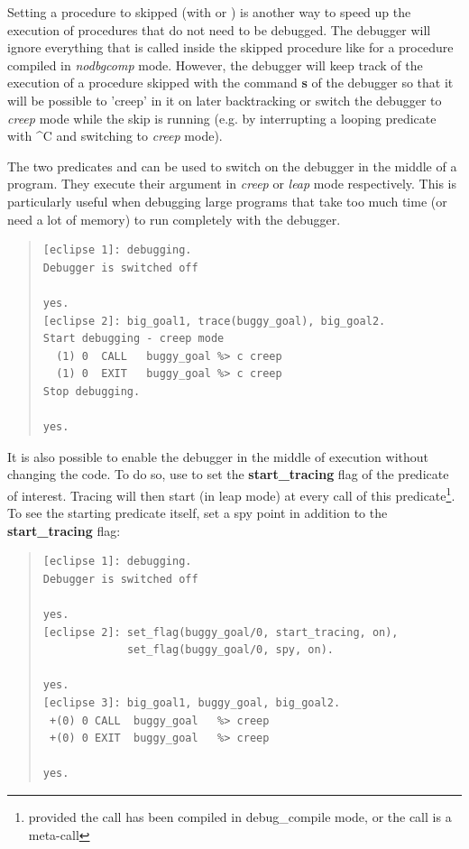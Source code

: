 Setting a procedure to skipped (with
 or
)
is another way
to speed up the execution of procedures that do not need to be
debugged.  The debugger will ignore everything that is called inside
the skipped procedure like for a procedure compiled in {\it nodbgcomp}
mode.  However, the debugger will keep track of the execution of a
procedure skipped with the command {\bf s} of the debugger so that it
will be possible to 'creep' in it on later backtracking or switch the
debugger to {\it creep} mode while the skip is running (e.g.  by
interrupting a looping predicate with \^\space C and switching to {\it
creep} mode).

The two predicates
 and
 can be used to
switch on the debugger in the middle of a program.  They execute their
argument in {\it creep} or {\it leap} mode respectively.  This is
particularly useful when debugging large programs that take too much
time (or need a lot of memory) to run completely with the debugger.
\begin{quote}\begin{verbatim}
[eclipse 1]: debugging.
Debugger is switched off

yes.
[eclipse 2]: big_goal1, trace(buggy_goal), big_goal2.
Start debugging - creep mode
  (1) 0  CALL   buggy_goal %> c creep
  (1) 0  EXIT   buggy_goal %> c creep
Stop debugging.

yes.
\end{verbatim}\end{quote}

It is also possible to enable the debugger in the middle of execution
without changing the code.  To do so, use
to set the {\bf start_tracing} flag of the predicate of interest.
Tracing will then start (in leap mode) at every call of this
predicate\footnote{provided the call has been compiled in debug_compile mode,
or the call is a meta-call}. To see the starting predicate itself,
set a spy point in addition to the {\bf start_tracing} flag:
\begin{quote}\begin{verbatim}
[eclipse 1]: debugging.
Debugger is switched off

yes.
[eclipse 2]: set_flag(buggy_goal/0, start_tracing, on),
             set_flag(buggy_goal/0, spy, on).

yes.
[eclipse 3]: big_goal1, buggy_goal, big_goal2.
 +(0) 0 CALL  buggy_goal   %> creep
 +(0) 0 EXIT  buggy_goal   %> creep

yes.
\end{verbatim}\end{quote}

